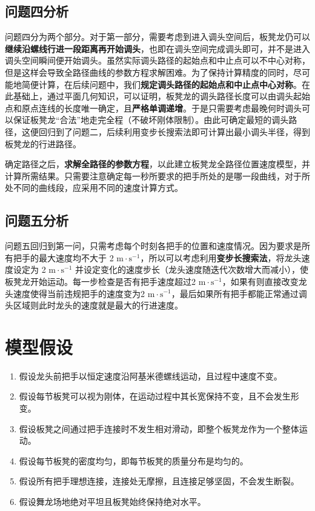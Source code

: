 \documentclass[zihao=-4, UTF8]{article}		%
\theoremstyle{MyLineTheoremStyle} %
\theoremstyle{MyBlockTheoremStyle} %
\theoremstyle{MySubsubsectionStyle} %
\begin{document}
\subsection{问题四分析}
问题四分为两个部分。对于第一部分，需要考虑到进入调头空间后，板凳龙仍可以\textbf{继续沿螺线行进一段距离再开始调头}，也即在调头空间完成调头即可，并不是进入调头空间瞬间便开始调头。虽然实际调头路径的起始点和中止点可以不中心对称，但是这样会导致全路径曲线的参数方程求解困难。为了保持计算精度的同时，尽可能地简便计算，在后续问题中，我们\textbf{规定调头路径的起始点和中止点中心对称}。在此基础上，通过平面几何知识，可以证明，板凳龙的调头路径长度可以由调头起始点和原点连线的长度唯一确定，且\textbf{严格单调递增}。于是只需要考虑最晚何时调头可以保证板凳龙“合法”地走完全程（不破坏刚体限制）。由此可确定最短的调头路径，这便回归到了问题二，后续利用变步长搜索法即可计算出最小调头半径，得到板凳龙的行进路径。\par
确定路径之后，\textbf{求解全路径的参数方程}，以此建立板凳龙全路径位置速度模型，并计算所需结果。只需要注意确定每一秒所要求的把手所处的是哪一段曲线，对于所处不同的曲线段，应采用不同的速度计算方式。

\subsection{问题五分析}
问题五回归到第一问，只需考虑每个时刻各把手的位置和速度情况。因为要求是所有把手的最大速度均不大于 2 $\mathrm{m\cdot s^{-1}}$，所以可以考虑利用\textbf{变步长搜索法}，将龙头速度设定为 2 $\mathrm{m\cdot s^{-1}}$ 并设定变化的速度步长（龙头速度随迭代次数增大而减小），使板凳龙开始运动。每一步检查是否有把手速度超过2 $\mathrm{m\cdot s^{-1}}$，如果有则直接改变龙头速度使得当前违规把手的速度变为2 $\mathrm{m\cdot s^{-1}}$，最后如果所有把手都能正常通过调头区域则此时龙头的速度就是最大的行进速度。\par


\section{模型假设}

\begin{enumerate}[leftmargin=2em]
\item 假设龙头前把手以恒定速度沿阿基米德螺线运动，且过程中速度不变。
\item 假设每节板凳可以视为刚体，在运动过程中其长宽保持不变，且不会发生形变。
\item 假设板凳之间通过把手连接时不发生相对滑动，即整个板凳龙作为一个整体运动。
\item 假设每节板凳的密度均匀，即每节板凳的质量分布是均匀的。
\item 假设所有把手理想连接，连接处无摩擦，且连接足够坚固，不会发生断裂。
\item 假设舞龙场地绝对平坦且板凳始终保持绝对水平。
\end{enumerate}
\end{document}
